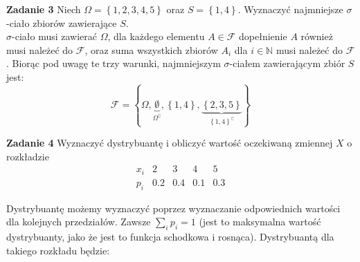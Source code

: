 \documentclass[a4paper,12pt]{article}
\newcommand{\set}[1]{\left \{ #1 \right \}}				%
\begin{document}
\noindent \newline \textbf{Zadanie 3} \newline
Niech $\Omega = \set{1, 2, 3, 4, 5}$ oraz $S = \set{1, 4}$. Wyznaczyć najmniejsze
$\sigma$-ciało zbiorów zawierające $S$. \\

\noindent $\sigma$-ciało musi zawierać $\Omega$, dla każdego elementu 
$A \in \mathcal{F}$ dopełnienie $A$ również musi należeć do $\mathcal{F}$,
oraz suma wszystkich zbiorów $A_i$ dla $i \in \mathbb{N}$ musi należeć do
$\mathcal{F}$. Biorąc pod uwagę te trzy warunki, najmniejszym $\sigma$-ciałem
zawierającym zbiór $S$ jest:
\[
    \mathcal{F} = \set{
        \Omega, 
        \underbrace{\emptyset}_{\Omega^\complement},
        \set{1, 4},
        \underbrace{\set{2, 3, 5}}_{\set{1, 4}^\complement}
    }
\]

\noindent \newline \textbf{Zadanie 4} \newline
Wyznaczyć dystrybuantę i obliczyć wartość oczekiwaną zmiennej $X$ o rozkładzie
\[
    \begin{matrix*}
        x_i &   2   &   3   &   4   &   5   \\
        p_i &   0.2 &   0.4 &   0.1 &   0.3
    \end{matrix*}
\]

\noindent Dystrybuantę możemy wyznaczyć poprzez wyznaczanie odpowiednich
wartości dla kolejnych przedziałów. Zawsze $\sum\limits_{i} p_i = 1$ (jest to
maksymalna wartość dystrybuanty, jako że jest to funkcja schodkowa i rosnąca).
Dystrybuantą dla takiego rozkładu będzie:
\end{document}
